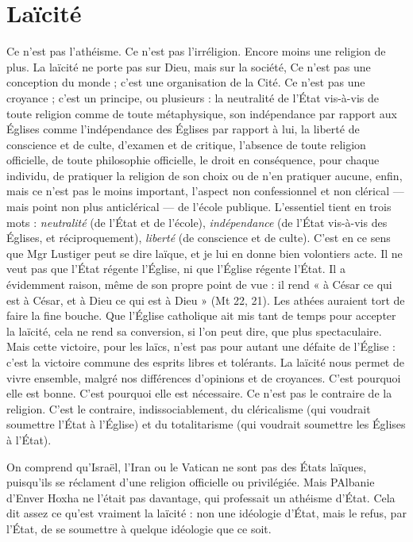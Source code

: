 {\section{Laïcité}
Ce n’est pas l’athéisme. Ce n’est pas l’irréligion. Encore moins
une religion de plus. La laïcité ne porte pas sur Dieu, mais sur la
société, Ce n’est pas une conception du monde ; c’est une organisation de la
Cité. Ce n’est pas une croyance ; c’est un principe, ou plusieurs : la neutralité
de l’État vis-à-vis de toute religion comme de toute métaphysique, son indépendance
par rapport aux Églises comme l'indépendance des Églises par rapport
à lui, la liberté de conscience et de culte, d'examen et de critique, l’absence
de toute religion officielle, de toute philosophie officielle, le droit en conséquence,
pour chaque individu, de pratiquer la religion de son choix ou de n’en
pratiquer aucune, enfin, mais ce n’est pas le moins important, l’aspect non
confessionnel et non clérical — mais point non plus anticlérical — de l’école
publique. L'essentiel tient en trois mots : {\it neutralité} (de l’État et de l’école),
{\it indépendance} (de l'État vis-à-vis des Églises, et réciproquement), {\it liberté} (de
conscience et de culte). C’est en ce sens que Mgr Lustiger peut se dire laïque,
et je lui en donne bien volontiers acte. Il ne veut pas que l'État régente l’Église,
ni que l’Église régente l'État. Il a évidemment raison, même de son propre
point de vue : il rend « à César ce qui est à César, et à Dieu ce qui est à Dieu »
(Mt 22, 21). Les athées auraient tort de faire la fine bouche. Que l'Église catholique
ait mis tant de temps pour accepter la laïcité, cela ne rend sa conversion,
si l’on peut dire, que plus spectaculaire. Mais cette victoire, pour les laïcs, n’est
pas pour autant une défaite de l’Église : c’est la victoire commune des esprits
libres et tolérants. La laïcité nous permet de vivre ensemble, malgré nos différences
d'opinions et de croyances. C’est pourquoi elle est bonne. C’est pourquoi
elle est nécessaire. Ce n’est pas le contraire de la religion. C’est le
contraire, indissociablement, du cléricalisme (qui voudrait soumettre l’État à
l'Église) et du totalitarisme (qui voudrait soumettre les Églises à l'État).

On comprend qu'Israël, l'Iran ou le Vatican ne sont pas des États laïques,
puisqu'ils se réclament d’une religion officielle ou privilégiée. Mais PAlbanie
d’Enver Hoxha ne l'était pas davantage, qui professait un athéisme d’État. Cela
dit assez ce qu’est vraiment la laïcité : non une idéologie d’État, mais le refus,
par l’État, de se soumettre à quelque idéologie que ce soit.

}
